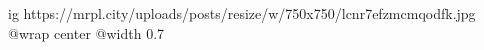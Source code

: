  
 
 
 
 

\ifcmt
  ig https://mrpl.city/uploads/posts/resize/w/750x750/lcnr7efzmcmqodfk.jpg
  @wrap center
  @width 0.7
\fi
